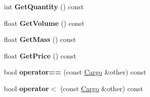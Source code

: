 \begin{DoxyCompactItemize}
\item 
int {\bfseries Get\+Quantity} () const \hypertarget{classCargo_a1a016e94e4661e0b56d81e59010e6503}{}\label{classCargo_a1a016e94e4661e0b56d81e59010e6503}

\item 
float {\bfseries Get\+Volume} () const \hypertarget{classCargo_a83981825fb7fa52bbbf974b534644884}{}\label{classCargo_a83981825fb7fa52bbbf974b534644884}

\item 
float {\bfseries Get\+Mass} () const \hypertarget{classCargo_abd725af5c0c36164963fb1d794451cf0}{}\label{classCargo_abd725af5c0c36164963fb1d794451cf0}

\item 
float {\bfseries Get\+Price} () const \hypertarget{classCargo_aafd544e2b27b39a53c3bbe56e405c392}{}\label{classCargo_aafd544e2b27b39a53c3bbe56e405c392}

\item 
bool {\bfseries operator==} (const \hyperlink{classCargo}{Cargo} \&other) const \hypertarget{classCargo_a4b2d3f88e1ae1b612935258a058b62c7}{}\label{classCargo_a4b2d3f88e1ae1b612935258a058b62c7}

\item 
bool {\bfseries operator$<$} (const \hyperlink{classCargo}{Cargo} \&other) const \hypertarget{classCargo_a0054924718b75b60f05b52c2d126222b}{}\label{classCargo_a0054924718b75b60f05b52c2d126222b}

\end{DoxyCompactItemize}
